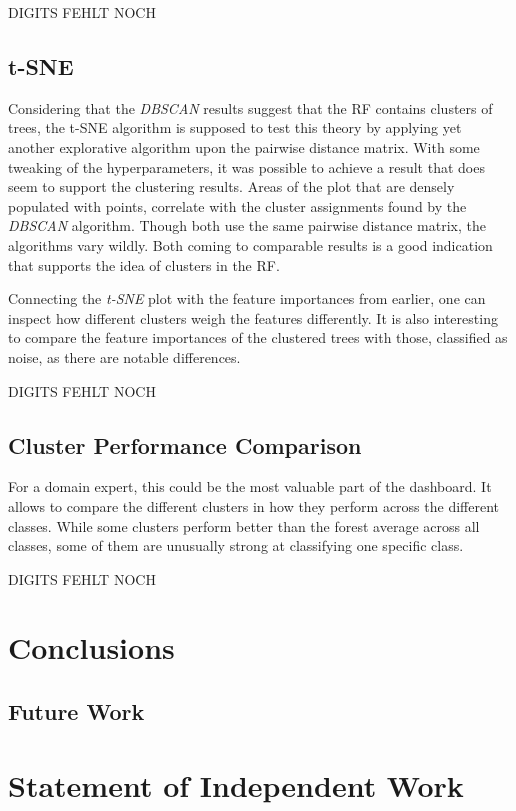 \documentclass[a4paper, 12pt]{article}
\begin{document}
DIGITS FEHLT NOCH

\subsection{t-SNE}
Considering that the \textit{DBSCAN} results suggest that the RF contains clusters of trees, the t-SNE algorithm
is supposed to test this theory by applying yet another explorative algorithm upon the pairwise distance matrix.
With some tweaking of the hyperparameters, it was possible to achieve a result that does seem to support the
clustering results. Areas of the plot that are densely populated with points, correlate with the cluster
assignments found by the \textit{DBSCAN} algorithm. Though both use the same pairwise distance matrix, the
algorithms vary wildly. Both coming to comparable results is a good indication that supports the idea of clusters
in the RF. \par
Connecting the \textit{t-SNE} plot with the feature importances from earlier, one can inspect how different
clusters weigh the features differently. It is also interesting to compare the feature importances of the
clustered trees with those, classified as noise, as there are notable differences.

DIGITS FEHLT NOCH

\subsection{Cluster Performance Comparison}
For a domain expert, this could be the most valuable part of the dashboard. It allows to compare the different
clusters in how they perform across the different classes. While some clusters perform better than the forest
average across all classes, some of them are unusually strong at classifying one specific class.

DIGITS FEHLT NOCH

\section{Conclusions}

\subsection{Future Work}

\section{Statement of Independent Work}

\clearpage


\end{document}
